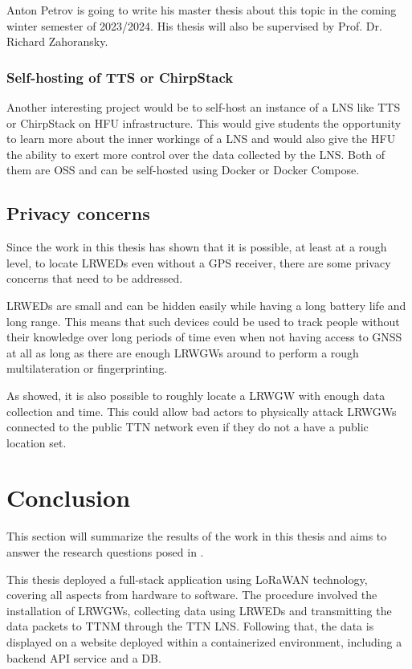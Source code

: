 Anton Petrov is going to write his master thesis about this topic in the coming winter semester of 2023/2024.
His thesis will also be supervised by Prof. Dr. Richard Zahoransky.

\subsubsection{Self-hosting of \acl{TTS} or ChirpStack}

Another interesting project would be to self-host an instance of a \ac{LNS} like \ac{TTS} or ChirpStack on \ac{HFU} infrastructure.
This would give students the opportunity to learn more about the inner workings of a \ac{LNS} and would also give the \ac{HFU} the ability to exert more control over the data collected by the \ac{LNS}.
Both of them are \ac{OSS} and can be self-hosted using Docker or Docker Compose.

\subsection{Privacy concerns}

Since the work in this thesis has shown that it is possible, at least at a rough level, to locate \aclp{LRWED} even without a \ac{GPS} receiver, there are some privacy concerns that need to be addressed.

\aclp{LRWED} are small and can be hidden easily while having a long battery life and long range.
This means that such devices could be used to track people without their knowledge over long periods of time even when not having access to \ac{GNSS} at all as long as there are enough \aclp{LRWGW} around to perform a rough multilateration or fingerprinting.

As  showed, it is also possible to roughly locate a \acl{LRWGW} with enough data collection and time.
This could allow bad actors to physically attack \aclp{LRWGW} connected to the public \ac{TTN} network even if they do not a have a public location set.

\section{Conclusion}

This section will summarize the results of the work in this thesis and aims to answer the research questions posed in .

This thesis deployed a full-stack application using \ac{LoRaWAN} technology, covering all aspects from hardware to software.
The procedure involved the installation of \aclp{LRWGW}, collecting data using \aclp{LRWED} and transmitting the data packets to \acl{TTNM} through the \ac{TTN} \acl{LNS}.
Following that, the data is displayed on a website deployed within a containerized environment, including a backend \ac{API} service and a \acl{DB}.

